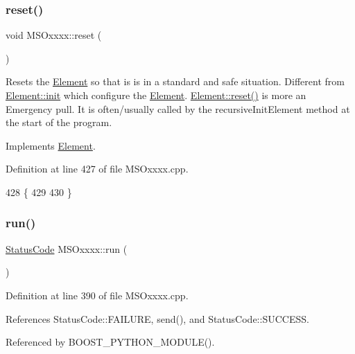 \subsubsection{\texorpdfstring{reset()}{reset()}}
{\footnotesize\ttfamily void M\+S\+Oxxxx\+::reset (\begin{DoxyParamCaption}{ }\end{DoxyParamCaption})\hspace{0.3cm}{\ttfamily [virtual]}}

Resets the \hyperlink{classElement}{Element} so that is is in a standard and safe situation. Different from \hyperlink{classElement_af42754b5cabc198869222725218d695c}{Element\+::init} which configure the \hyperlink{classElement}{Element}. \hyperlink{classElement_a69efffa22f06909d768149715565cb56}{Element\+::reset()} is more an Emergency pull. It is often/usually called by the recursive\+Init\+Element method at the start of the program. 

Implements \hyperlink{classElement_a69efffa22f06909d768149715565cb56}{Element}.



Definition at line 427 of file M\+S\+Oxxxx.\+cpp.


\begin{DoxyCode}
428 \{
429 
430 \}
\end{DoxyCode}
\mbox{\label{classMSOxxxx_a96ca34744e5a6b611aaf9ae7910f00cd}} 
\subsubsection{\texorpdfstring{run()}{run()}}
{\footnotesize\ttfamily \hyperlink{classStatusCode}{Status\+Code} M\+S\+Oxxxx\+::run (\begin{DoxyParamCaption}{ }\end{DoxyParamCaption})}



Definition at line 390 of file M\+S\+Oxxxx.\+cpp.



References Status\+Code\+::\+F\+A\+I\+L\+U\+RE, send(), and Status\+Code\+::\+S\+U\+C\+C\+E\+SS.



Referenced by B\+O\+O\+S\+T\+\_\+\+P\+Y\+T\+H\+O\+N\+\_\+\+M\+O\+D\+U\+L\+E().


